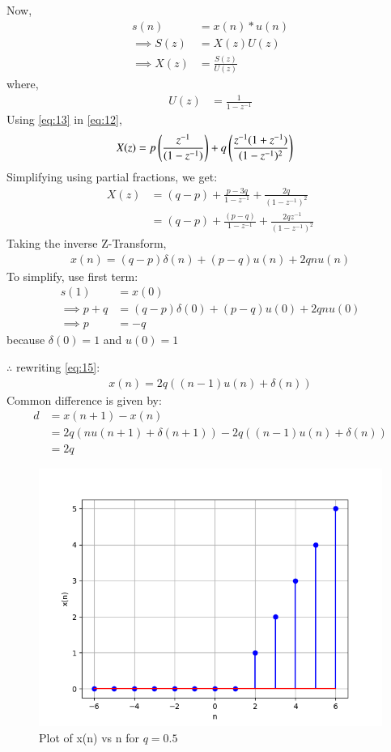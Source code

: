 \documentclass[journal,12pt,twocolumn]{IEEEtran}
\theoremstyle{remark}
\begin{document}
Now, 
\begin{align}
    s(n) &= x(n) \ast u(n)\\
    \implies S(z) &= X(z)U(z)\\
    \implies X(z) &= \frac{S(z)}{U(z)}\label{eq:12}
\end{align}
where,
\begin{align}
    U(z) &= \frac{1}{1 - z^{-1}}\label{eq:13}
\end{align}
Using \eqref{eq:13} in \eqref{eq:12},
\begin{align}
    X(z) &= p\left(\frac{z^{-1}}{(1-z^{-1})}\right) + q\left(\frac{z^{-1}(1 + z^{-1})}{(1-z^{-1})^2}\right)
\end{align}
Simplifying using partial fractions, we get:
\begin{align}
    X(z) &= (q-p) + \frac{p-3q}{1-z^{-1}} + \frac{2q}{(1-z^{-1})^2}\\
    &= (q - p) + \frac{(p-q)}{1-z^{-1}} + \frac{2qz^{-1}}{(1-z^{-1})^2}
\end{align}
Taking the inverse Z-Transform,
\begin{align}
    x(n) = (q-p)\delta(n) + (p-q)u(n) + 2qnu(n)\label{eq:15}
\end{align}
To simplify, use first term:
\begin{align}
    s(1) &= x(0)\\
    \implies p + q &= (q-p)\delta(0) + (p-q)u(0) + 2qnu(0)\\
    \implies p &= -q
\end{align}
because $\delta(0) = 1$ and $u(0) = 1$

$\therefore$ rewriting \eqref{eq:15}:
\begin{align}
    x(n) = 2q((n-1)u(n) + \delta(n))
\end{align}
Common difference is given by:
\begin{align}
    d &= x(n+1) - x(n)\\
    &= 2q(nu(n+1) + \delta(n+1)) - 2q((n-1)u(n) + \delta(n))\\
    &= 2q
\end{align}
\begin{figure}[!h]
    \centering
    \includegraphics[width = \columnwidth]{figs/x_plot.png}
    \caption{Plot of x(n) vs n for $q=0.5$}
    \label{fig:1}
\end{figure}
\end{document}
